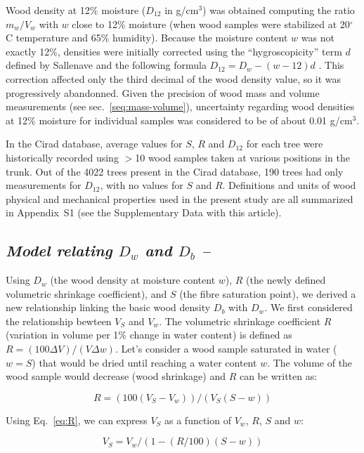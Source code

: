 \documentclass[a4paper, 12pt, leqno, dvipsnames]{article}\usepackage[]{graphicx}\usepackage[]{color}
\begin{document}
Wood density at 12\% moisture ($D_{12}$ in g/cm$^3$) was obtained computing the ratio $m_w/V_w$ with $w$ close to 12\% moisture (when wood samples were stabilized at 20$^\circ$C temperature and 65\% humidity). Because the moisture content $w$ was not exactly 12\%, densities were initially corrected using the ``hygroscopicity'' term $d$ defined by Sallenave and the following formula $D_{12}=D_w-(w-12)d$ \citep{Sallenave1971}. This correction affected only the third decimal of the wood density value, so it was progressively abandonned. Given the precision of wood mass and volume measurements (see sec.~\ref{seq:mass-volume}), uncertainty regarding wood densities at 12\% moisture for individual samples was considered to be of about 0.01 g/cm$^3$.

In the Cirad database, average values for $S$, $R$ and $D_{12}$ for each tree were historically recorded using $>$10 wood samples taken at various positions in the trunk. Out of the 4022 trees present in the Cirad database, 190 trees had only measurements for $D_{12}$, with no values for $S$ and $R$. Definitions and units of wood physical and mechanical properties used in the present study are all summarized in Appendix~S1 (see the Supplementary Data with this article).

\subsection*{\textit{Model relating $D_{w}$ and $D_b$ --}}

Using $D_{w}$ (the wood density at moisture content $w$), $R$ (the newly defined volumetric shrinkage coefficient), and $S$ (the fibre saturation point), we derived a new relationship linking the basic wood density $D_b$ with $D_w$. We first considered the relationship bewteen $V_S$ and $V_w$. The volumetric shrinkage coefficient $R$ (variation in volume per 1\% change in water content) is defined as $R=(100 \Delta V) / (V \Delta w)$. Let's consider a wood sample saturated in water ($w=S$) that would be dried until reaching a water content $w$. The volume of the wood sample would decrease (wood shrinkage) and $R$ can be written as: 

\begin{equation}
  R=(100(V_S-V_w))/(V_S(S-w))
  \label{eq:R}
\end{equation}

Using Eq.~\ref{eq:R}, we can express $V_S$ as a function of $V_w$, $R$, $S$ and $w$:

\begin{equation}
  V_S=V_w/(1-(R/100)(S-w))
  \label{eq:V_S}
\end{equation}
\end{document}
